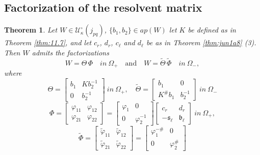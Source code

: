 \documentclass[12pt,twoside,a4paper]{amsart}
\newtheorem{thm}{Theorem}[section]
\theoremstyle{definition}
\numberwithin{equation}{section}
\begin{document}
\subsection{Factorization of the resolvent matrix}
\begin{thm}
\label{thm:11.8} Let $W\in{{\mathcal U}}_\kappa^\circ(j_{pq})$, 
$\{b_1, b_2\}\in ap(W)$  let $K$ be defined as in Theorem
\ref{thm:11.7}, and let $c_r$, $d_r$, $c_\ell$ and $d_\ell$ be as in
Theorem \ref{thm:jun1a8} (3). Then $W$ admits the factorizations
\begin{equation}
\label{eq:11.34}
W=\Theta\,\Phi\quad in\  \Omega_+\quad\text{and}\quad W={{{\widetilde {\Theta}} }}\,{{{\widetilde {\Phi}} }}
\quad in\ \Omega_-,
\end{equation}
where
\begin{equation}
\label{eq:11.33}
\Theta=\begin{bmatrix}b_1&Kb_2^{-1}\\0&b_2^{-1}\end{bmatrix}\ in \ \Omega_+,
\quad
{{{\widetilde {\Theta}} }}=\begin{bmatrix}b_1&0\\K^\# b_1&b_2^{-1}\end{bmatrix}\ in \ \Omega_-
\end{equation}
\begin{equation}
\label{eq:11.35}
\Phi= \begin{bmatrix}\varphi_{11}& \varphi_{12}\\
\varphi_{21}&\varphi_{22}\end{bmatrix}=
\begin{bmatrix}\varphi_1&0\\0&\varphi_2^{-1}\end{bmatrix}
\begin{bmatrix}c_r&d_r\\-{{\mathfrak s}}_\ell&{{\mathfrak b}}_\ell\end{bmatrix}\ in \ \Omega_+,
\end{equation}
\begin{equation}
\label{eq:11.36}
{{{\widetilde {\Phi}} }}= \begin{bmatrix}{{{\widetilde \varphi} }}_{11}& {{{\widetilde \varphi} }}_{12}\\
{{{\widetilde \varphi} }}_{21}&{{{\widetilde \varphi} }}_{22}\end{bmatrix}=
\begin{bmatrix}\varphi_1^{-\#}&0\\0&\varphi_2^\#\end{bmatrix}

\end{equation}
\end{thm}
\end{document}
